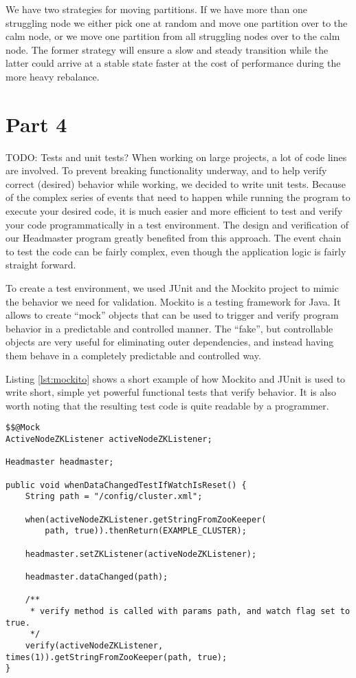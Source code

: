 We have two strategies for moving partitions. If we have more than one struggling node we either pick one at random and move one partition over to the calm node, or we move one partition from all struggling nodes over to the calm node. The former strategy will ensure a slow and steady transition while the latter could arrive at a stable state faster at the cost of performance during the more heavy rebalance.


\section{Part 4}
\label{sec:testing}
TODO: Tests and unit tests?
When working on large projects, a lot of code lines are involved. To prevent breaking functionality underway, and to help verify correct (desired) behavior while working, we decided to write unit tests. 
Because of the complex series of events that need to happen while running the program to execute your desired code, it is much easier and more efficient to test and verify your code programmatically in a test environment. The design and verification of our Headmaster program greatly benefited from this approach. The event chain to test the code can be fairly complex, even though the application logic is fairly straight forward.

To create a test environment, we used JUnit and the Mockito project to mimic the behavior we need for validation.
Mockito is a testing framework for Java. It allows to create ``mock'' objects that can be used to trigger and verify program behavior in a predictable and controlled manner. The ``fake'', but controllable objects are very useful for eliminating outer dependencies, and instead having them behave in a completely predictable and controlled way.

Listing \ref{lst:mockito} shows a short example of how Mockito and JUnit is used to write short, simple yet powerful functional tests that verify behavior. It is also worth noting that the resulting test code is quite readable by a programmer.

\begin{lstlisting}[style=customjava,label=lst:mockito,caption={Test code utilizing Mockito. Think of the \texttt{@Mock} class as a subclass with all methods overrided \texttt{return null;}.}]
$$@Mock
ActiveNodeZKListener activeNodeZKListener;

Headmaster headmaster;

public void whenDataChangedTestIfWatchIsReset() {
    String path = "/config/cluster.xml";

    when(activeNodeZKListener.getStringFromZooKeeper(
    	path, true)).thenReturn(EXAMPLE_CLUSTER);

    headmaster.setZKListener(activeNodeZKListener);

    headmaster.dataChanged(path);

    /** 
     * verify method is called with params path, and watch flag set to true.
     */
    verify(activeNodeZKListener, times(1)).getStringFromZooKeeper(path, true);
}

\end{lstlisting}

